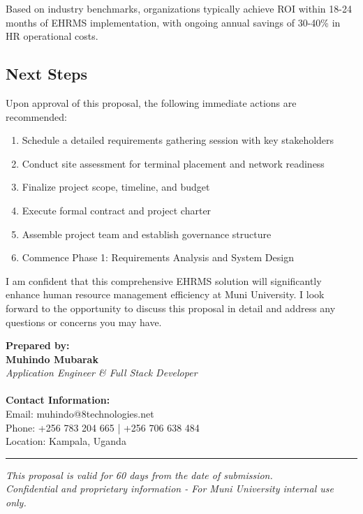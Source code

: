 \documentclass[12pt]{article}
\begin{document}
Based on industry benchmarks, organizations typically achieve ROI within 18-24 months of EHRMS implementation, with ongoing annual savings of 30-40\% in HR operational costs.

\subsection{Next Steps}

Upon approval of this proposal, the following immediate actions are recommended:

\begin{enumerate}
\item Schedule a detailed requirements gathering session with key stakeholders
\item Conduct site assessment for terminal placement and network readiness
\item Finalize project scope, timeline, and budget
\item Execute formal contract and project charter
\item Assemble project team and establish governance structure
\item Commence Phase 1: Requirements Analysis and System Design
\end{enumerate}

\vspace{1cm}

\noindent
I am confident that this comprehensive EHRMS solution will significantly enhance human resource management efficiency at Muni University. I look forward to the opportunity to discuss this proposal in detail and address any questions or concerns you may have.

\vspace{1.5cm}

\noindent
\textbf{Prepared by:} \\
\textbf{Muhindo Mubarak} \\
\textit{Application Engineer \& Full Stack Developer} \\
\\
\textbf{Contact Information:} \\
Email: muhindo@8technologies.net \\
Phone: +256 783 204 665 | +256 706 638 484 \\
Location: Kampala, Uganda \\

\vspace{0.5cm}

\noindent
\rule{\textwidth}{0.4pt}
\begin{center}
\textit{This proposal is valid for 60 days from the date of submission.} \\
\textit{Confidential and proprietary information - For Muni University internal use only.}
\end{center}
\end{document}
